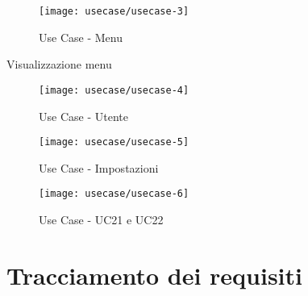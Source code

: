 \newpage

\begin{figure}[!h] 
    \centering 
    \texttt{[image: usecase/usecase-3]} 
    \caption{Use Case - Menu}
\end{figure}

\begin{usecase}{6}{Visualizzazione menu} %
\end{usecase}

\newpage

\begin{figure}[!h] 
    \centering 
    \texttt{[image: usecase/usecase-4]} 
    \caption{Use Case - Utente}
\end{figure}

\newpage

\begin{figure}[!h] 
    \centering 
    \texttt{[image: usecase/usecase-5]} 
    \caption{Use Case - Impostazioni}
\end{figure}

\newpage

\begin{figure}[!h] 
    \centering 
    \texttt{[image: usecase/usecase-6]} 
    \caption{Use Case - UC21 e UC22}
\end{figure}

\newpage

\section{Tracciamento dei requisiti}

